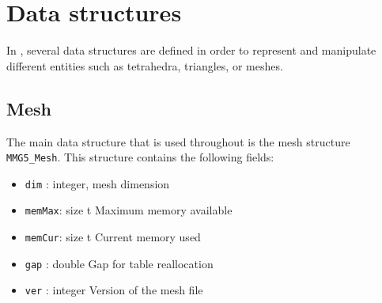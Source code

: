 \chapter{Data structures}

In \mmg, several data structures are defined in order to represent and manipulate different entities such as tetrahedra, triangles, or meshes.

\section{Mesh}

The main data structure that is used throughout \mmg is the mesh structure \texttt{MMG5\_Mesh}.
This structure contains the following fields:

\begin{itemize}
\item \texttt{dim}   : integer, mesh dimension
\item \texttt{memMax}: size t Maximum memory available
\item \texttt{memCur}: size t Current memory used
\item \texttt{gap}   : double Gap for table reallocation
\item \texttt{ver}   : integer Version of the mesh file

\end{itemize}


